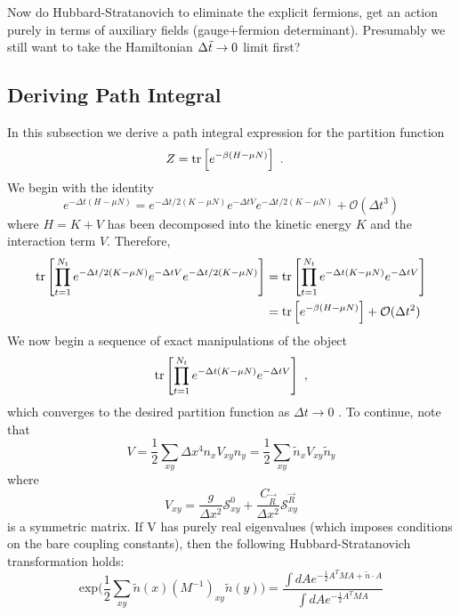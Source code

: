Now do Hubbard-Stratanovich to eliminate the explicit fermions, get an action purely in terms of auxiliary fields (gauge+fermion determinant).
Presumably we still want to take the Hamiltonian $\Delta\tilde{t}\rightarrow0$ limit first?

\subsection{Deriving Path Integral}
In this subsection we derive a path integral expression for the partition function
\begin{align}
	Z
	&=
	\text{tr}\left[e^{-\beta(H-\mu N)}\right]~.
\end{align}
We begin with the identity
\begin{equation}
e^{-\Delta t(H - \mu N)} = e^{-\Delta t/2(K - \mu N)}  e^{-\Delta t V}  e^{-\Delta t/2(K - \mu N)} + \mathcal{O}(\Delta t^3) 
\end{equation}
where $H = K + V$ has been decomposed into the kinetic energy $K$ and the interaction term $V$. Therefore,
\begin{align}
\text{tr}\left[\prod_{t=1}^{N_t} e^{-\Delta t/2(K - \mu N)}  e^{-\Delta t V}  e^{-\Delta t/2(K - \mu N)}\right] & =
\text{tr}\left[\prod_{t=1}^{N_t} e^{-\Delta t(K - \mu N)}  e^{-\Delta t V}  \right] \\
& =  \text{tr}\left[e^{-\beta(H-\mu N)}\right] + \mathcal{O}(\Delta t^2)
\end{align}
We now begin a sequence of exact manipulations of the object 
\begin{equation}
\text{tr}\left[\prod_{t=1}^{N_t} e^{-\Delta t(K - \mu N)}  e^{-\Delta t V}  \right]~,
\end{equation}
which converges to the desired partition function as $\Delta t \rightarrow 0$ . To continue, note that
\begin{equation}
V =  \frac{1}{2} \sum_{xy} \Delta x^4 n_x V_{xy} n_y = \frac{1}{2} \sum_{xy} \tilde{n}_x V_{xy} \tilde{n}_y 
\end{equation}
where 
\begin{equation}
V_{xy} = \frac{g}{\Delta x^2} \mathcal{S}^0_{x y} + \frac{C_{ \vec{R} }}{\Delta x^2} \mathcal{S}^{ \vec{R} }_{xy}
\end{equation}
is a symmetric matrix. If V has purely real eigenvalues (which imposes conditions on the bare coupling constants), then the following Hubbard-Stratanovich transformation holds:
\begin{equation}
\text{exp}\Bigg( \frac{1}{2} \sum_{x y}\tilde{n}(x) (M^{-1})_{xy} \tilde{n}(y) \Bigg) 
= 
\frac{\int d {A} e^{-\frac{1}{2} {A}^T M A + \tilde{n} \cdot {A} } }{ \int d {A} e^{-\frac{1}{2} {A}^T M A  } }
\end{equation}

